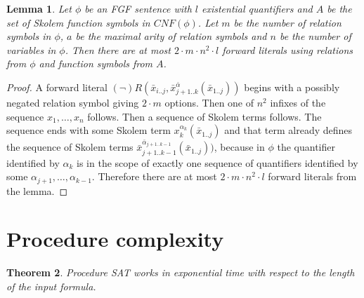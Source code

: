 \documentclass[english, shortabstract]{iithesis}
\theoremstyle{definition} \newtheorem{definition}{Definition}[chapter]
\theoremstyle{remark} \newtheorem{remark}[definition]{Observation}
\theoremstyle{plain} \newtheorem{theorem}[definition]{Theorem}
\theoremstyle{plain} \newtheorem{lemma}[definition]{Lemma}
\begin{document}
\begin{lemma}\label{lem:size}
Let $\phi$ be an FGF sentence with $l$ existential quantifiers and 
$A$ be the set of Skolem function symbols in $CNF(\phi)$.
Let $m$ be the number of relation symbols in $\phi$, $a$ be the maximal arity
of relation symbols and $n$ be the number of variables in $\phi$. 
Then there are at most $2\cdot m \cdot n^2 \cdot l$ forward literals using relations from $\phi$ and function symbols from $A$.
\end{lemma}
\begin{proof}
A forward literal $(\lnot)R(\bar{x}_{i..j}, \bar{x}^{\bar{\alpha}}_{{j+1..k}}(\bar{x}_{1..j}))$
begins with a possibly negated relation symbol giving $2\cdot m$ options. 
Then one of $n^2$ infixes of the sequence $x_1, \dots, x_n$ follows.
Then a sequence of Skolem terms follows.
The sequence ends with some Skolem term $x^{\alpha_k}_k(\bar{x}_{1..j})$ and that term 
already defines the sequence of Skolem terms $\bar{x}^{\bar{\alpha}_{j+1..k-1}}_{{j+1..k-1}}(\bar{x}_{1..j}))$,
because in $\phi$ the quantifier identified by $\alpha_k$ is in the scope of exactly one sequence of quantifiers identified by some $\alpha_{j+1},\dots, \alpha_{k-1}$.
Therefore there are at most $2\cdot m \cdot n^2 \cdot l$ forward literals from the lemma.
\end{proof}

\section{Procedure complexity}

\begin{theorem}
Procedure SAT works in exponential time with respect to the length of the input formula. 
\end{theorem}
\end{document}
